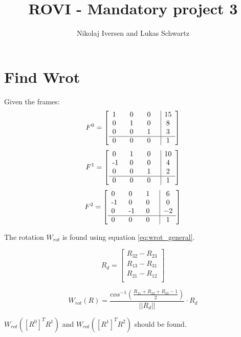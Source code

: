\documentclass[a4paper,10pt]{article}
\title{ROVI - Mandatory project 3}
\author{Nikolaj Iversen and Lukas Schwartz}
\begin{document}
\maketitle

\section{Find Wrot}

Given the frames:
\[ 
F^0 = 
\left[
\begin{array}{*{3}{p{0.5cm}}|c}
    1 & 0 & 0 & 15 \\
    0 & 1 & 0 &  8 \\
    0 & 0 & 1 &  3 \\\hline
    0 & 0 & 0 &  1 \\
\end{array}
\right]
\]
\[ 
F^1 = 
\left[
\begin{array}{*{3}{p{0.5cm}}|c}
    0 & 1 & 0 & 10 \\
   -1 & 0 & 0 &  4 \\
    0 & 0 & 1 &  2 \\\hline
    0 & 0 & 0 &  1 \\
\end{array}
\right]
\]
\[ 
F^2 = 
\left[
\begin{array}{*{3}{p{0.5cm}}|c}
    0 & 0 & 1 &  6 \\
   -1 & 0 & 0 &  0 \\
    0 &-1 & 0 & -2 \\\hline
    0 & 0 & 0 &  1 \\
\end{array}
\right]
\]

The rotation \(W_{rot}\) is found using equation \ref{eq:wrot_general}. 

\begin{equation}
 R_d = 
 \left[ 
 \begin{array}{c}
  R_{32} - R_{23}\\
  R_{13} - R_{31}\\
  R_{21} - R_{12}\\
 \end{array}
 \right]
\end{equation}

\begin{equation}
 W_{rot}(R) = \frac{cos^{-1} \left( \frac{R_{11}+R_{22}+R_{33}-1}{2} \right) }{||R_d||} \cdot R_d \label{eq:wrot_general}
\end{equation}

\(W_{rot}(\left[R^0\right]^T R^1)\) and \(W_{rot}(\left[R^1\right]^T R^2)\) should be found.
\end{document}
